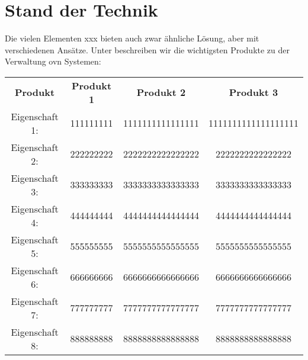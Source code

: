 \section{Stand der Technik}

Die vielen Elementen xxx bieten auch zwar ähnliche Lösung, aber mit verschiedenen Ansätze.
Unter beschreiben wir die wichtigsten Produkte zu der Verwaltung ovn Systemen:


\begin {table}
\centering
\begin{tabular}{c|c|c|c}
    \textbf{Produkt} & \textbf{Produkt 1} & \textbf{Produkt 2} & \textbf{Produkt 3} \\
    Eigenschaft 1:   & 111111111          &  1111111111111111  &  1111111111111111111 \\
    Eigenschaft 2:   & 222222222          &  2222222222222222  &  2222222222222222 \\
    Eigenschaft 3:   & 333333333          &  3333333333333333  &  3333333333333333 \\
    Eigenschaft 4:   & 444444444          &  4444444444444444  &  4444444444444444 \\
    Eigenschaft 5:   & 555555555          &  5555555555555555  &  5555555555555555 \\
    Eigenschaft 6:   & 666666666          &  6666666666666666  &  6666666666666666 \\
    Eigenschaft 7:   & 777777777          &  7777777777777777  &  7777777777777777 \\
    Eigenschaft 8:   & 888888888          &  8888888888888888  &  8888888888888888 \\

\end{tabular}
\end {table}